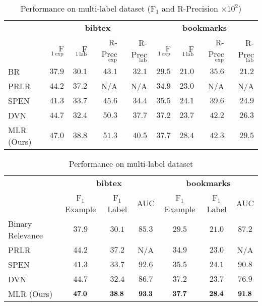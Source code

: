 \begin{table}[!h]
\centering
\newcommand{\nan}{{\small N/A}}
\caption{Performance on multi-label dataset (F$_1$ and R-Precision $\times 10^2$)}
\label{tab:perf_mlc}
\small
\begin{tabular}{l|*{4}{r}|*{4}{r}}
\toprule
{} & \multicolumn{4}{c|}{\textbf{bibtex}} & \multicolumn{4}{c}{\textbf{bookmarks}} \\
{} & F$_{1\,\text{exp}}$ & F$_{1\,\text{lab}}$ & R-Prec$_{\,\text{exp}}$ & R-Prec$_{\,\text{lab}}$ 
   & F$_{1\,\text{exp}}$ & F$_{1\,\text{lab}}$ & R-Prec$_{\,\text{exp}}$ & R-Prec$_{\,\text{lab}}$ \\
\midrule
BR~\cite{tsoumakas2006multi}       &  $37.9$  &  $30.1$  &  $43.1$  &  $32.1$  &  $29.5$  &  $21.0$  &  $35.6$  &  $21.2$ \\
PRLR~\cite{lin2014multi}           &  $44.2$  &  $37.2$  &    \nan  &    \nan  &  $34.9$  &  $23.0$  &    \nan  &    \nan \\
SPEN~\cite{belanger2016structured} &  $41.3$  &  $33.7$  &  $45.6$  &  $34.4$  &  $35.5$  &  $24.1$  &  $39.6$  &  $24.9$ \\
DVN~\cite{gygli2017deep}           &  $44.7$  &  $32.4$  &  $50.3$  &  $37.7$  &  $37.2$  &  $23.7$  &  $42.2$  &  $26.3$ \\
\rowcolor[gray]{0.8}
MLR (Ours)                         &  $47.0$  &  $38.8$  &  $51.3$  &  $40.5$  &  $37.7$  &  $28.4$  &  $42.3$  &  $29.5$ \\
\bottomrule
\end{tabular}
\end{table}


\begin{table}[!h]
\centering
\caption{Performance on multi-label dataset}
\label{tab:perf_mlc}
\setlength{\tabcolsep}{2pt} %
\begin{tabular}{l|ccc|ccc}
\toprule
{} & \multicolumn{3}{c|}{\textbf{bibtex}} & \multicolumn{3}{c}{\textbf{bookmarks}} \\
{} &   F$_1$ Example & F$_1$ Label &    AUC &      F$_1$ Example & F$_1$ Label &    AUC \\
\midrule
Binary Relevance~\cite{}           &          $37.9$ &      $30.1$ & $85.3$ &             $29.5$ &      $21.0$ & $87.2$ \\
PRLR~\cite{lin2014multi}           &          $44.2$ &      $37.2$ &    N/A &             $34.9$ &      $23.0$ &    N/A \\
SPEN~\cite{belanger2016structured} &          $41.3$ &      $33.7$ & $92.6$ &             $35.5$ &      $24.1$ & $90.8$ \\
DVN~\cite{gygli2017deep}           &          $44.7$ &      $32.4$ & $86.7$ &             $37.2$ &      $23.7$ & $76.9$ \\
MLR (Ours)                         &          ${\bf 47.0}$ & ${\bf 38.8}$ & ${\bf 93.3}$ & ${\bf 37.7}$ & ${\bf 28.4}$ & ${\bf 91.8}$ \\
\bottomrule
\end{tabular}
\end{table}



